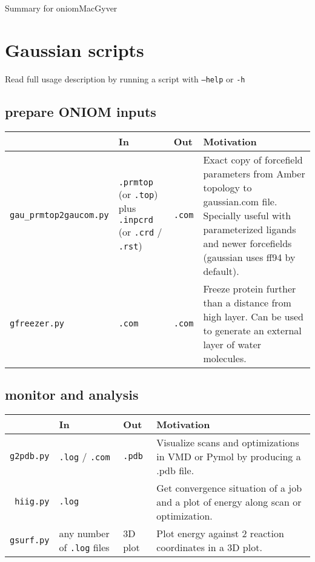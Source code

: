 \documentclass[11pt,a4paper]{article}
\begin{document}
\begin{centering}
\begin{Large}
Summary for oniomMacGyver 
\end{Large}
\end{centering}

\section{Gaussian scripts}
Read full usage description by running a script with \texttt{--help} or \texttt{-h}

\subsection{prepare ONIOM inputs} 
\begin{tabular}{|R{2.5cm}|C{4.5cm}|C{1cm}|C{7cm}|}
    \hline
     & In & Out & Motivation \\
    \hline
    \texttt{gau\_prmtop2gaucom.py} & \texttt{.prmtop} (or \texttt{.top}) \newline plus \newline
\texttt{.inpcrd} (or \texttt{.crd} / \texttt{.rst}) & \texttt{.com} &
Exact copy of forcefield parameters from Amber topology to gaussian.com file.
Specially useful with parameterized ligands and newer forcefields
(gaussian uses ff94 by default).\\
\hline
    \texttt{gfreezer.py} & \texttt{.com} & \texttt{.com}  & 
    Freeze protein further than a distance from high layer.
    Can be used to generate an external layer of water molecules.\\
\hline
\end{tabular}

\subsection{monitor and analysis}
\begin{tabular}{|r|C{2.5cm}|C{1.5cm}|C{8cm}|}
    \hline
     & In & Out & Motivation \\
    \hline
    \texttt{g2pdb.py} & \texttt{.log} / \texttt{.com} & \texttt{.pdb} &
Visualize scans and optimizations in VMD or Pymol by producing a .pdb file. \\
    \hline
    \texttt{hiig.py} & \texttt{.log} & & Get convergence situation of a job and a
 plot of energy along scan or optimization. \\
    \hline
    \texttt{gsurf.py} & any number of \texttt{.log} files & 3D plot & Plot energy 
against 2 reaction coordinates in a 3D plot. \\
    \hline
\end{tabular}
\end{document}
